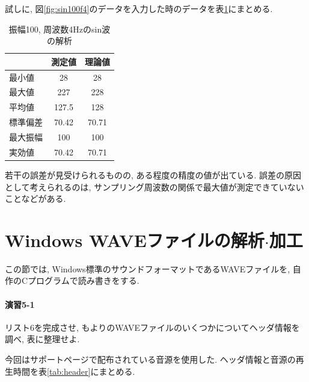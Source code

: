 \documentclass[titlepage]{jsarticle}
\begin{document}
        試しに, 図\ref{fig:sin100f4}のデータを入力した時のデータを表\ref{tab:stat}にまとめる.

        \begin{table}[ht]
            \centering
            \caption{振幅100, 周波数4Hzのsin波の解析}
            \label{tab:stat}
            \begin{tabular}{l||c|c} \hline
                & 測定値 & 理論値 \\ \hline
                最小値 & 28 & 28 \\
                最大値 & 227 & 228 \\
                平均値 & 127.5 & 128 \\
                標準偏差 & 70.42 & 70.71 \\
                最大振幅 & 100 & 100 \\
                実効値 & 70.42 & 70.71 \\ \hline
            \end{tabular}
        \end{table}

        若干の誤差が見受けられるものの, ある程度の精度の値が出ている.
        誤差の原因として考えられるのは, サンプリング周波数の関係で最大値が測定できていないことなどがある.

\section{Windows WAVEファイルの解析$\cdot$加工}
    この節では, Windows標準のサウンドフォーマットであるWAVEファイルを,
    自作のCプログラムで読み書きをする.

    \paragraph{演習5-1} リスト6を完成させ, もよりのWAVEファイルのいくつかについてヘッダ情報を調べ,
    表に整理せよ.

        今回はサポートページ\cite{Support Page}で配布されている音源を使用した.
        ヘッダ情報と音源の再生時間を表\ref{tab:header}にまとめる.
\end{document}
